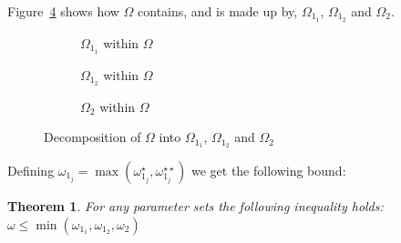 \documentclass{article}
\newtheorem{theorem}{Theorem}
\begin{document}
Figure~\ref{fig:decomposeqnet} shows how $\Omega$ contains, and is made up by, $\Omega_{1_1}$, $\Omega_{1_2}$ and $\Omega_2$.

\begin{figure}[!htbp]
\begin{subfigure}[b]{0.5\textwidth}
  
  \caption{$\Omega_{1_1}$ within $\Omega$}
  \label{fig:omega11withinomega}
\end{subfigure}
\begin{subfigure}[b]{0.5\textwidth}
  
  \caption{$\Omega_{1_2}$ within $\Omega$}
  \label{fig:omega12withinomega}
\end{subfigure}
\begin{center}
\begin{subfigure}[b]{0.5\textwidth}
  
  \caption{$\Omega_2$ within $\Omega$}
  \label{fig:omega2withinomega}
\end{subfigure}
\end{center}
\caption{Decomposition of $\Omega$ into $\Omega_{1_1}$, $\Omega_{1_2}$ and $\Omega_2$}
\label{fig:decomposeqnet}
\end{figure}

Defining $\omega_{1_j} = \max(\omega_{1_j}^{\star}, \omega_{1_j}^{\star\star})$ we get the following bound:\\

\begin{theorem}
For any parameter sets the following inequality holds:
$\omega \leq \min(\omega_{1_1}, \omega_{1_2}, \omega_2)$
\end{theorem}
\end{document}
